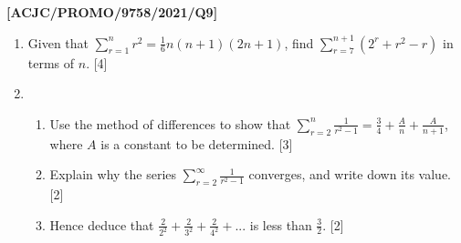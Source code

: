 \item \textbf{{[}ACJC/PROMO/9758/2021/Q9{]}}
\begin{enumerate}
\item Given that $\sum\limits _{r=1}^{n}r^{2}=\frac{1}{6}n\left(n+1\right)\left(2n+1\right)$,
find $\sum\limits _{r=7}^{n+1}\left(2^{r}+r^{2}-r\right)$ in terms
of $n$. \hfill{}{[}4{]}
\item {}
\begin{enumerate}
\item Use the method of differences to show that $\sum\limits _{r=2}^{n}\frac{1}{r^{2}-1}=\frac{3}{4}+\frac{A}{n}+\frac{A}{n+1}$,
where $A$ is a constant to be determined. \hfill{}{[}3{]}
\item Explain why the series $\sum\limits _{r=2}^{\infty}\frac{1}{r^{2}-1}$
converges, and write down its value. \hfill{}{[}2{]}
\item Hence deduce that $\frac{2}{2^{2}}+\frac{2}{3^{2}}+\frac{2}{4^{2}}+...$
is less than $\frac{3}{2}$. \hfill{}{[}2{]}
\end{enumerate}
\end{enumerate}